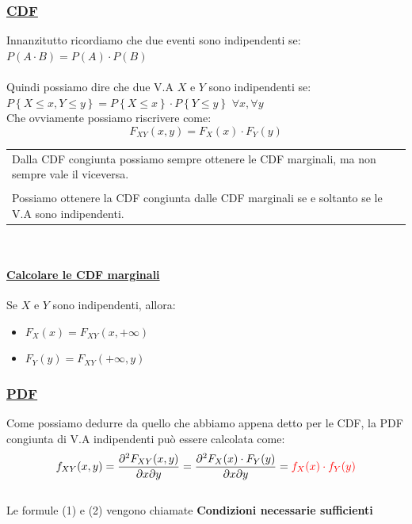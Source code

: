 \documentclass{article}
\begin{document}
\subsubsection{\underline{CDF}}
Innanzitutto ricordiamo che due eventi sono indipendenti se: $P(A \cdot B) = P(A) \cdot P(B)$ \\ \\
Quindi possiamo dire che due V.A $X$ e $Y$ sono indipendenti se: $P\left\{ X \leq x, Y \leq y \right\} = P\left\{X \leq x \right\} \cdot P\left\{Y \leq y \right\}$   $\forall x, \forall y$ \\
Che ovviamente possiamo riscrivere come: 
\begin{equation}
   F_{XY}(x,y) = F_X(x) \cdot F_Y(y) 
\end{equation}
\begin{tabular}{|p{13cm}}
Dalla CDF congiunta possiamo sempre ottenere le CDF marginali, ma non sempre vale il viceversa. \\ \\
Possiamo ottenere la CDF congiunta dalle CDF marginali se e soltanto se le V.A sono indipendenti. 
\end{tabular} \\
\paragraph{\underline{Calcolare le CDF marginali}}
Se $X$ e $Y$ sono indipendenti, allora: 
\begin{itemize}
    \item $F_X(x) = F_{XY}(x,+\infty)$
    \item $F_Y(y) = F_{XY}(+\infty,y)$
\end{itemize}
\subsubsection{\underline{PDF}}
Come possiamo dedurre da quello che abbiamo appena detto per le CDF, la PDF congiunta di V.A indipendenti può essere calcolata come: 
\begin{equation}
    f_{XY}(x,y) = \frac{\partial^2F_{XY}(x,y)}{\partial x \partial y} = \frac{\partial^2 F_X(x) \cdot F_Y(y)}{\partial x \partial y} = {\color{red}f_X(x) \cdot f_Y(y)}
\end{equation} ~\\
Le formule (1) e (2) vengono chiamate \textbf{Condizioni necessarie sufficienti}
\end{document}
